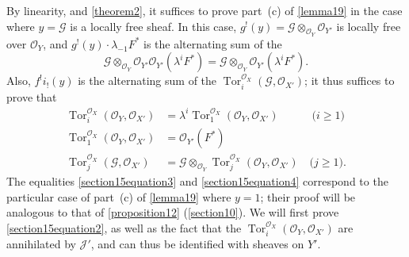 \documentclass{article}
\theoremstyle{plain}
\theoremstyle{definition}
\newcommand{\sh}{\mathscr}
\renewcommand{\geq}{\geqslant}
\DeclareMathOperator{\Tor}{Tor}
\newcommand{\oldpage}[1]{\marginpar{\footnotesize$\Big\vert$ \textit{p.~#1}}}
\begin{document}
By linearity, and \cref{theorem2}, it suffices to prove part~(c) of \cref{lemma19} in the case where $y=\sh{G}$ is a locally free sheaf.
In this case, $g^!(y)=\sh{G}\otimes_{\sh{O}_Y}\sh{O}_{Y'}$ is locally free over $\sh{O}_Y$, and $g^!(y)\cdot\lambda_{-1}F^*$ is the alternating sum of the
\[
  \sh{G} \otimes_{\sh{O}_Y} \sh{O}_{Y'} \sh{O}_{Y'}(\lambda^i F^*)
  = \sh{G} \otimes_{\sh{O}_Y} \sh{O}_{Y'}(\lambda^i F^*).
\]
Also, $f^!i_!(y)$ is the alternating sum of the $\Tor_i^{\sh{O}_X}(\sh{G},\sh{O}_{X'})$;
it thus suffices to prove that
\begin{align*}
  \label{section15equation2}
    \Tor_i^{\sh{O}_X}(\sh{O}_Y,\sh{O}_{X'}) &= \lambda^i\Tor_1^{\sh{O}_X}(\sh{O}_Y,\sh{O}_{X'})
    \qquad\quad\mbox{($i\geq1$)}
    \tag{2}
\\
  \label{section15equation3}
    \Tor_1^{\sh{O}_X}(\sh{O}_Y,\sh{O}_{X'}) &= \sh{O}_{Y'}(F^*)
    \tag{3}
\\
  \label{section15equation4}
    \Tor_j^{\sh{O}_X}(\sh{G},\sh{O}_{X'}) &= \sh{G}\otimes_{\sh{O}_Y}\Tor_j^{\sh{O}_X}(\sh{O}_Y,\sh{O}_{X'})
    \quad\mbox{($j\geq1$).}
    \tag{4}
\end{align*}
\oldpage{131}
The equalities \cref{section15equation3} and \cref{section15equation4} correspond to the particular case of part~(c) of \cref{lemma19} where $y=1$;
their proof will be analogous to that of \cref{proposition12} (\cref{section10}).
We will first prove \cref{section15equation2}, as well as the fact that the $\Tor_i^{\sh{O}_X}(\sh{O}_Y,\sh{O}_{X'})$ are annihilated by $\sh{J}'$, and can thus be identified with sheaves on $Y'$.
\end{document}
